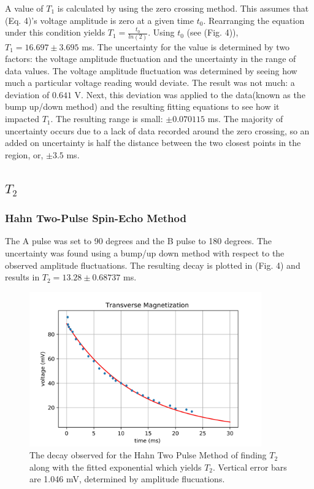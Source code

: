 \documentclass[]{report}
\begin{document}
A value of $T_{1}$ is calculated by using the zero crossing method. This assumes that (Eq. 4)'s voltage amplitude is zero at a given time $t_{0}$. Rearranging the equation under this condition yields $T_{1} = \frac{t_{0}}{ln(2)}$. Using $t_{0}$ (see (Fig. 4)), $T_{1} = 16.697 \pm 3.695$ ms. The uncertainty for the value is determined by two factors: the voltage amplitude fluctuation and the uncertainty in the range of data values.
The voltage amplitude fluctuation was determined by seeing how much a particular voltage reading would deviate. The result was not much: a deviation of $0.641$ V. Next, this deviation was applied to the data(known as the bump up/down method) and the resulting fitting equations to see how it impacted $T_{1}$. The resulting range is small: $\pm 0.070115$ ms.
The majority of uncertainty occurs due to a lack of data recorded around the zero crossing, so an added on uncertainty is half the distance between the two closest points in the region, or, $\pm 3.5$ ms. 

\subsection{$T_{2}$}


\subsubsection{Hahn Two-Pulse Spin-Echo Method}

The A pulse was set to 90 degrees and the B pulse to 180 degrees. The uncertainty was found using a bump/up down method with respect to the observed amplitude fluctuations. The resulting decay is plotted in (Fig. 4) and results in $T_{2} = 13.28 \pm 0.68737$ ms.

\begin{figure}[h]

\centering
\includegraphics[width=10cm]{Hahn} 

\caption{The decay observed for the Hahn Two Pulse Method of finding $T_{2}$ along with the fitted exponential which yields $T_{2}$. Vertical error bars are 1.046 mV, determined by amplitude flucuations.}
\end{figure}
\end{document}
